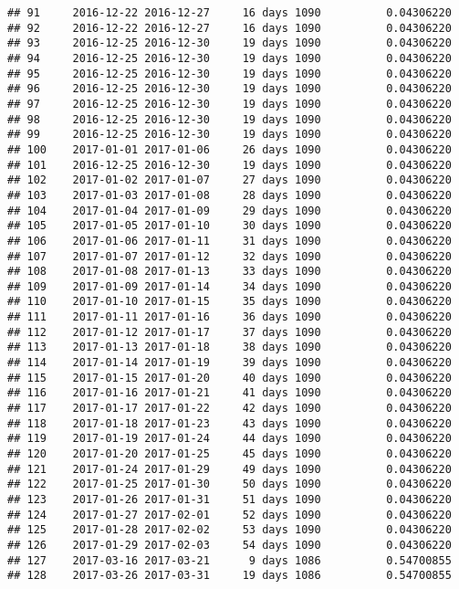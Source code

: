 \documentclass[]{article}
\begin{document}
\begin{verbatim}
## 91     2016-12-22 2016-12-27     16 days 1090          0.04306220
## 92     2016-12-22 2016-12-27     16 days 1090          0.04306220
## 93     2016-12-25 2016-12-30     19 days 1090          0.04306220
## 94     2016-12-25 2016-12-30     19 days 1090          0.04306220
## 95     2016-12-25 2016-12-30     19 days 1090          0.04306220
## 96     2016-12-25 2016-12-30     19 days 1090          0.04306220
## 97     2016-12-25 2016-12-30     19 days 1090          0.04306220
## 98     2016-12-25 2016-12-30     19 days 1090          0.04306220
## 99     2016-12-25 2016-12-30     19 days 1090          0.04306220
## 100    2017-01-01 2017-01-06     26 days 1090          0.04306220
## 101    2016-12-25 2016-12-30     19 days 1090          0.04306220
## 102    2017-01-02 2017-01-07     27 days 1090          0.04306220
## 103    2017-01-03 2017-01-08     28 days 1090          0.04306220
## 104    2017-01-04 2017-01-09     29 days 1090          0.04306220
## 105    2017-01-05 2017-01-10     30 days 1090          0.04306220
## 106    2017-01-06 2017-01-11     31 days 1090          0.04306220
## 107    2017-01-07 2017-01-12     32 days 1090          0.04306220
## 108    2017-01-08 2017-01-13     33 days 1090          0.04306220
## 109    2017-01-09 2017-01-14     34 days 1090          0.04306220
## 110    2017-01-10 2017-01-15     35 days 1090          0.04306220
## 111    2017-01-11 2017-01-16     36 days 1090          0.04306220
## 112    2017-01-12 2017-01-17     37 days 1090          0.04306220
## 113    2017-01-13 2017-01-18     38 days 1090          0.04306220
## 114    2017-01-14 2017-01-19     39 days 1090          0.04306220
## 115    2017-01-15 2017-01-20     40 days 1090          0.04306220
## 116    2017-01-16 2017-01-21     41 days 1090          0.04306220
## 117    2017-01-17 2017-01-22     42 days 1090          0.04306220
## 118    2017-01-18 2017-01-23     43 days 1090          0.04306220
## 119    2017-01-19 2017-01-24     44 days 1090          0.04306220
## 120    2017-01-20 2017-01-25     45 days 1090          0.04306220
## 121    2017-01-24 2017-01-29     49 days 1090          0.04306220
## 122    2017-01-25 2017-01-30     50 days 1090          0.04306220
## 123    2017-01-26 2017-01-31     51 days 1090          0.04306220
## 124    2017-01-27 2017-02-01     52 days 1090          0.04306220
## 125    2017-01-28 2017-02-02     53 days 1090          0.04306220
## 126    2017-01-29 2017-02-03     54 days 1090          0.04306220
## 127    2017-03-16 2017-03-21      9 days 1086          0.54700855
## 128    2017-03-26 2017-03-31     19 days 1086          0.54700855

\end{verbatim}
\end{document}
